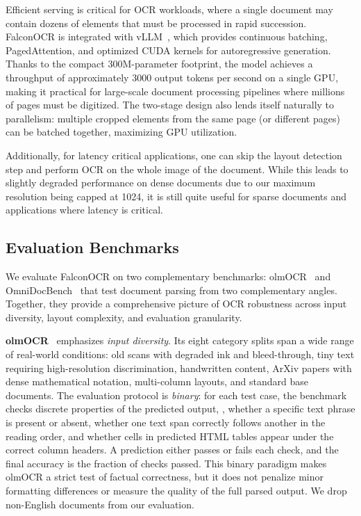 Efficient serving is critical for OCR workloads, where a single document may contain dozens of elements that must be processed in rapid succession. FalconOCR is integrated with vLLM~\citep{kwon2023efficient}, which provides continuous batching, PagedAttention, and optimized CUDA kernels for autoregressive generation. Thanks to the compact 300M-parameter footprint, the model achieves a throughput of approximately \num{3000} output tokens per second on a single GPU, making it practical for large-scale document processing pipelines where millions of pages must be digitized. The two-stage design also lends itself naturally to parallelism: multiple cropped elements from the same page (or different pages) can be batched together, maximizing GPU utilization.

Additionally, for latency critical applications, one can skip the layout detection step and perform OCR on the whole image of the document. While this leads to slightly degraded performance on dense documents due to our maximum resolution being capped at 1024, it is still quite useful for sparse documents and applications where latency is critical.

\subsection{Evaluation Benchmarks}

We evaluate FalconOCR on two complementary benchmarks: olmOCR~\citep{poznanski2025olmocr} and OmniDocBench~\citep{ouyang2025omnidocbench} that test document parsing from two complementary angles. Together, they provide a comprehensive picture of OCR robustness across input diversity, layout complexity, and evaluation granularity.

\noindent \textbf{olmOCR}~\citep{poznanski2025olmocr} emphasizes \textit{input diversity}. Its eight category splits span a wide range of real-world conditions: old scans with degraded ink and bleed-through, tiny text requiring high-resolution discrimination, handwritten content, ArXiv papers with dense mathematical notation, multi-column layouts, and standard base documents. The evaluation protocol is \textit{binary}: for each test case, the benchmark checks discrete properties of the predicted output, \ie, whether a specific text phrase is present or absent, whether one text span correctly follows another in the reading order, and whether cells in predicted HTML tables appear under the correct column headers. A prediction either passes or fails each check, and the final accuracy is the fraction of checks passed. This binary paradigm makes olmOCR a strict test of factual correctness, but it does not penalize minor formatting differences or measure the quality of the full parsed output.
We drop non-English documents from our evaluation.

